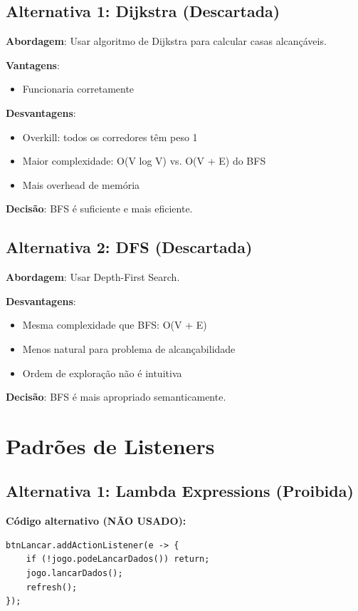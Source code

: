 \documentclass[12pt,a4paper]{report}
\begin{document}
\subsection{Alternativa 1: Dijkstra (Descartada)}

\textbf{Abordagem}: Usar algoritmo de Dijkstra para calcular casas alcançáveis.

\textbf{Vantagens}:
\begin{itemize}
    \item Funcionaria corretamente
\end{itemize}

\textbf{Desvantagens}:
\begin{itemize}
    \item Overkill: todos os corredores têm peso 1
    \item Maior complexidade: O(V log V) vs. O(V + E) do BFS
    \item Mais overhead de memória
\end{itemize}

\textbf{Decisão}: BFS é suficiente e mais eficiente.

\subsection{Alternativa 2: DFS (Descartada)}

\textbf{Abordagem}: Usar Depth-First Search.

\textbf{Desvantagens}:
\begin{itemize}
    \item Mesma complexidade que BFS: O(V + E)
    \item Menos natural para problema de alcançabilidade
    \item Ordem de exploração não é intuitiva
\end{itemize}

\textbf{Decisão}: BFS é mais apropriado semanticamente.

\section{Padrões de Listeners}

\subsection{Alternativa 1: Lambda Expressions (Proibida)}

\textbf{Código alternativo (NÃO USADO):}
\begin{lstlisting}
btnLancar.addActionListener(e -> {
    if (!jogo.podeLancarDados()) return;
    jogo.lancarDados();
    refresh();
});
\end{lstlisting}
\end{document}
